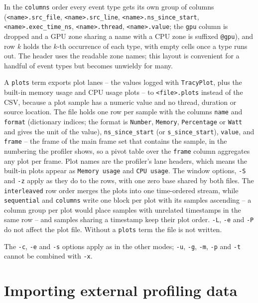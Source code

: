 \documentclass[hidelinks,titlepage,a4paper,twoside]{article}
\begin{document}
In the \texttt{columns} order every event type gets its own group of columns (\texttt{<name>.src\_file}, \texttt{<name>.src\_line}, \texttt{<name>.ns\_since\_start}, \texttt{<name>.exec\_time\_ns}, \texttt{<name>.thread}, \texttt{<name>.value}; the \texttt{gpu} column is dropped and a GPU zone sharing a name with a CPU zone is suffixed \texttt{@gpu}), and row $k$ holds the $k$-th occurrence of each type, with empty cells once a type runs out. The header uses the readable zone names; this layout is convenient for a handful of event types but becomes unwieldy for many.

A \texttt{plots} term exports plot lanes -- the values logged with \texttt{TracyPlot}, plus the built-in memory usage and CPU usage plots -- to \texttt{<file>.plots} instead of the CSV, because a plot sample has a numeric value and no thread, duration or source location. The file holds one row per sample with the columns \texttt{name} and \texttt{format} (dictionary indices; the format is \texttt{Number}, \texttt{Memory}, \texttt{Percentage} or \texttt{Watt} and gives the unit of the value), \texttt{ns\_since\_start} (or \texttt{s\_since\_start}), \texttt{value}, and \texttt{frame} -- the frame of the main frame set that contains the sample, in the numbering the profiler shows, so a pivot table over the \texttt{frame} column aggregates any plot per frame. Plot names are the profiler's lane headers, which means the built-in plots appear as \texttt{Memory usage} and \texttt{CPU usage}. The window options, \texttt{-S} and \texttt{-z} apply as they do to the rows, with one zero base shared by both files. The \texttt{interleaved} row order merges the plots into one time-ordered stream, while \texttt{sequential} and \texttt{columns} write one block per plot with its samples ascending -- a column group per plot would place samples with unrelated timestamps in the same row -- and samples sharing a timestamp keep their plot order. \texttt{-L}, \texttt{-e} and \texttt{-P} do not affect the plot file. Without a \texttt{plots} term the file is not written.

The \texttt{-c}, \texttt{-e} and \texttt{-s} options apply as in the other modes; \texttt{-u}, \texttt{-g}, \texttt{-m}, \texttt{-p} and \texttt{-t} cannot be combined with \texttt{-x}.

\section{Importing external profiling data}
\label{importingdata}
\end{document}
